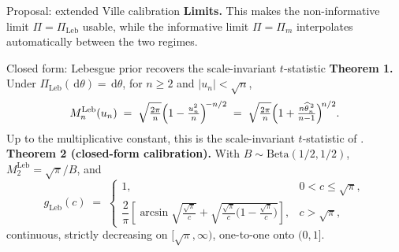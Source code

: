 \documentclass[final]{beamer}
\newcommand{\dd}{\,\mathrm{d}}
\newcommand{\Leb}{\mathrm{Leb}}
\newcommand{\thetahat}{\widehat{\theta}_n}
\newlength{\colwidth}
\begin{document}
\begin{frame}[t]
\begin{columns}[t]
\begin{column}{\colwidth}
\begin{alertblock}{Proposal: extended Ville calibration}
  \vspace{0.08cm} 
  \textbf{Limits.} This makes the non-informative limit $\Pi=\Pi_{\Leb}$ usable, while the informative limit $\Pi=\Pi_m$ interpolates automatically between the two regimes. 
\end{alertblock}

\begin{block}{Closed form: Lebesgue prior recovers the scale-invariant \texorpdfstring{$t$}{t}-statistic}
    \textbf{Theorem 1.} Under $\Pi_{\Leb}(\dd\theta)=\dd\theta$, for $n\ge 2$ and $|u_n|<\sqrt n$,
    {\large
    \[
      M_n^{\Leb}(u_n) \;=\; \sqrt{\tfrac{2\pi}{n}}\Bigl(1-\tfrac{u_n^{2}}{n}\Bigr)^{\!-n/2} \;=\; \sqrt{\tfrac{2\pi}{n}}\Bigl(1+\tfrac{n\thetahat^{\,2}}{n-1}\Bigr)^{\!n/2}.
    \]}
    Up to the multiplicative constant, this is the scale-invariant $t$-statistic of \cite{Lai1976}.
    \vspace{0.1cm}
    \textbf{Theorem 2 (closed-form calibration).} With $B\sim\mathrm{Beta}(1/2,1/2)$, $M_2^{\Leb}=\sqrt\pi/B$, and
    \[
      g_{\Leb}(c) \;=\; \begin{cases}
        1, & 0<c\le\sqrt\pi,\\[2pt]
        \dfrac{2}{\pi}\!\left[\arcsin\!\sqrt{\tfrac{\sqrt\pi}{c}}+\sqrt{\tfrac{\sqrt\pi}{c}\bigl(1-\tfrac{\sqrt\pi}{c}\bigr)}\right], & c>\sqrt\pi,
      \end{cases}
    \]
    continuous, strictly decreasing on $[\sqrt\pi,\infty)$, one-to-one onto $(0,1]$.
  \end{block}







\end{column}
\end{columns}
\end{frame}
\end{document}
